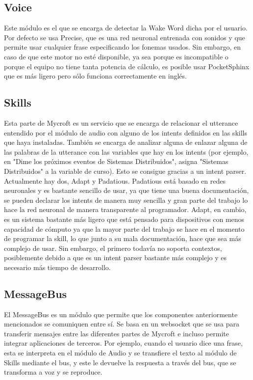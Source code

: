 \subsection{Voice}
Este módulo es el que se encarga de detectar la Wake Word dicha por el usuario. Por defecto se usa Precise, que es una red neuronal entrenada con sonidos y que permite usar cualquier frase especificando los fonemas usados. Sin embargo, en caso de que este motor no esté disponible, ya sea porque es incompatible o porque el equipo no tiene tanta potencia de cálculo, es posible usar PocketSphinx que es más ligero pero sólo funciona correctamente en inglés.
\subsection{Skills}
Esta parte de Mycroft es un servicio que se encarga de relacionar el utterance entendido por el módulo de audio con alguno de los intents definidos en las skills que haya instaladas. También se encarga de analizar alguna de enlazar alguna de las palabras de la utterance con las variables que hay en los intents (por ejemplo, en "Dime los próximos eventos de Sistemas Distribuidos", asigna "Sistemas Distribuidos" a la variable de curso). Esto se consigue gracias a un intent parser.
Actualmente hay dos, Adapt y Padatious. Padatious está basado en redes neuronales y es bastante sencillo de usar, ya que tiene una buena documentación, se pueden declarar los intents de manera muy sencilla y gran parte del trabajo lo hace la red neuronal de manera transparente al programador. Adapt, en cambio, es un sistema bastante más ligero que está pensado para dispositivos con menos capacidad de cómputo ya que la mayor parte del trabajo se hace en el momento de programar la skill, lo que junto a su mala documentación, hace que sea más complejo de usar. Sin embargo, el primero todavía no soporta contextos, posiblemente debido a que es un intent parser bastante más complejo y es necesario más tiempo de desarrollo.
\subsection{MessageBus}
El MessageBus es un módulo que permite que los componentes anteriormente mencionados se comuniquen entre sí. Se basa en un websocket que se usa para transferir mensajes entre las diferentes partes de Mycroft e incluso permite integrar aplicaciones de terceros. Por ejemplo, cuando el usuario dice una frase, esta se interpreta en el módulo de Audio y se transfiere el texto al módulo de Skills mediante el bus, y este le devuelve la respuesta a través del bus, que se transforma a voz y se reproduce.

